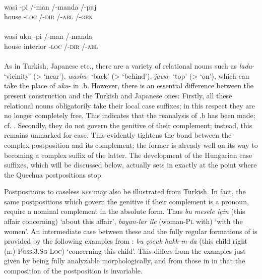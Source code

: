 \ea\label{ex:E56}
 \\
 \ea
 \gll  wasi  {}-pi  /-man  /-manda  /-paj\\
  house  {}-\textsc{loc}  /-\textsc{dir}  /-\textsc{abl}  /-\textsc{gen}\\
\\
\ex
\gll  wasi  uku  {}-pi  /-man  /-manda\\
house  interior  {}-\textsc{loc}  /-\textsc{dir}  /-\textsc{abl}\\
\\
\z
\z
\noindent As in Turkish, Japanese etc., there are a variety of relational nouns such as \textit{ladu}{}- ‘vicinity’ ({\textgreater} ‘near’), \textit{washa}{}- ‘back’ ({\textgreater} ‘behind’), \textit{jawa}{}- ‘top’ ({\textgreater} ‘on’), which can take the place of \textit{uku}{}- in .b. However, there is an essential difference between the present construction and the Turkish and Japanese ones: Firstly, all these relational nouns obligatorily take their local case suffixes; in this respect they are no longer completely free. This indicates that the reanalysis of .b has been made; cf. \citealt[120]{Cole1982}. Secondly, they do not govern the genitive of their complement; instead, this remains unmarked for case. This evidently tightens the bond between the complex postposition and its complement; the former is already well on its way to becoming a complex suffix of the latter. The development of the Hungarian case suffixes, which will be discussed below, actually sets in exactly at the point where the Quechua postpositions stop.

Postpositions to caseless \textsc{np}s may also be illustrated from Turkish. In fact, the same postpositions which govern the genitive if their complement is a pronoun, require a nominal complement in the absolute form. Thus \textit{bu mesele için} (this affair concerning) ‘about this affair’, \textit{bayan-lar ile} (woman-\textsc{Pl} with) ‘with the women’. An intermediate case between these and the fully regular formations of  is provided by the following examples from \citet[30]{Kahr1975}: \textit{bu çocuk hakk-ın-da} (this child right (n.)-\textsc{Poss.3.Sg-Loc}) ‘concerning this child’. This differs from the examples just given by being fully analyzable morphologically, and from those in  in that the composition of the postposition is invariable.


